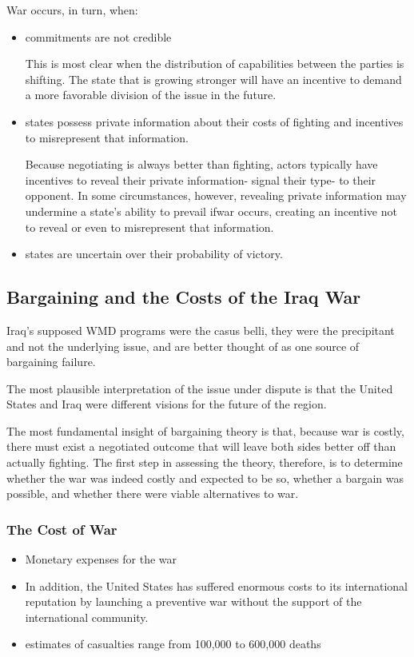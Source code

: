 War occurs, in turn, when:
\begin{itemize}
    \item [(1)] commitments are not credible

    This is most clear when the distribution of capabilities between the parties is shifting. The state that is growing stronger will have an incentive to demand a more favorable division of the issue in the future.

    \item [(2)] states possess private information about their costs of fighting and incentives to misrepresent that information.

    Because negotiating is always better than fighting, actors typically have incentives to reveal their private information- signal their type- to their opponent. In some circumstances, however, revealing private information may undermine a state's ability to prevail ifwar occurs, creating an incentive not to reveal or even to misrepresent that information.
    \item [(3)] states are uncertain over their probability of victory.
\end{itemize}

\subsection{Bargaining and the Costs of the Iraq War}
Iraq's supposed WMD programs were the casus belli, they were the precipitant and not the underlying issue, and are better thought of as one source of bargaining failure.

The most plausible interpretation of the issue under dispute is that the United States and Iraq were different visions for the future of the region.

The most fundamental insight of bargaining theory is that, because war is costly, there must exist a negotiated outcome that will leave both sides better off than actually fighting. The first step in assessing the theory, therefore, is to determine whether the war was indeed costly and expected to be so, whether a bargain was possible, and whether there were viable alternatives to war.

\subsubsection{The Cost of War}
\begin{itemize}
    \item Monetary expenses for the war
    \item In addition, the United States has suffered enormous costs to its international reputation by launching a preventive war without the support of the international community.
    \item estimates of casualties range from 100,000 to 600,000 deaths
\end{itemize}


